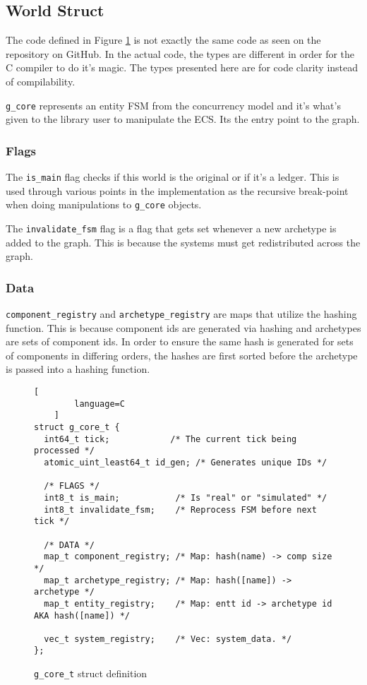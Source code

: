 \subsection{World Struct}
The code defined in Figure \ref{code:g_core_t} is not exactly the same code as seen on the repository on GitHub. In the actual code, the types are different in order for the C compiler to do it's magic. The types presented here are for code clarity instead of compilability.

\texttt{g\_core} represents an entity FSM from the concurrency model and it's what's given to the library user to manipulate the ECS. Its the entry point to the graph.

\subsubsection{Flags}
The \texttt{is\_main} flag checks if this world is the original or if it's a ledger. This is used through various points in the implementation as the recursive break-point when doing manipulations to \texttt{g\_core} objects. 

The \texttt{invalidate\_fsm} flag is a flag that gets set whenever a new archetype is added to the graph. This is because the systems must get redistributed across the graph.

\subsubsection{Data}
\texttt{component\_registry} and \texttt{archetype\_registry} are maps that utilize the hashing function. This is because component ids are generated via hashing and archetypes are sets of component ids. In order to ensure the same hash is generated for sets of components in differing orders, the hashes are first sorted before the archetype is passed into a hashing function. 

\begin{figure}[htbp]
    \begin{lstlisting}[
        language=C
    ]
struct g_core_t {
  int64_t tick;            /* The current tick being processed */
  atomic_uint_least64_t id_gen; /* Generates unique IDs */
    
  /* FLAGS */
  int8_t is_main;           /* Is "real" or "simulated" */
  int8_t invalidate_fsm;    /* Reprocess FSM before next tick */

  /* DATA */
  map_t component_registry; /* Map: hash(name) -> comp size */
  map_t archetype_registry; /* Map: hash([name]) -> archetype */
  map_t entity_registry;    /* Map: entt id -> archetype id AKA hash([name]) */
    
  vec_t system_registry;    /* Vec: system_data. */
};
    \end{lstlisting}
    \caption{\texttt{g\_core\_t} struct definition}
    \label{code:g_core_t}
\end{figure}

